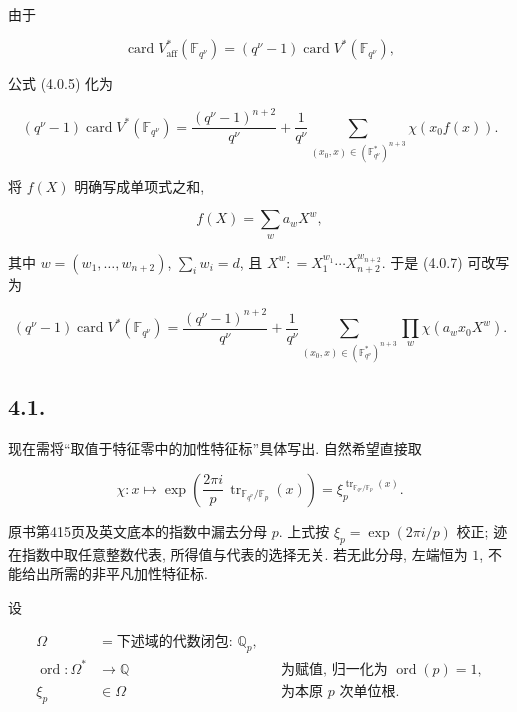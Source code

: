 由于

\begin{equation}\tag{4.0.6}
\operatorname{card}V^*_{\mathrm{aff}}(\mathbb F_{q^\nu})
=(q^\nu-1)\operatorname{card}V^*(\mathbb F_{q^\nu}),
\end{equation}

公式 (4.0.5) 化为

\begin{equation}\tag{4.0.7}
(q^\nu-1)\operatorname{card}V^*(\mathbb F_{q^\nu})
=\frac{(q^\nu-1)^{n+2}}{q^\nu}
+\frac1{q^\nu}
\sum_{(x_0,x)\in(\mathbb F_{q^\nu}^*)^{n+3}}\chi(x_0f(x)).
\end{equation}

将 $f(X)$ 明确写成单项式之和,

\begin{equation}\tag{4.0.8}
f(X)=\sum_w a_wX^w,
\end{equation}

其中 $w=(w_1,\ldots,w_{n+2})$, $\sum_iw_i=d$,
且 $X^w\mathrel{\mathop:}=X_1^{w_1}\cdots X_{n+2}^{w_{n+2}}$.
于是 (4.0.7) 可改写为

\begin{equation}\tag{4.0.9}
(q^\nu-1)\operatorname{card}V^*(\mathbb F_{q^\nu})
=\frac{(q^\nu-1)^{n+2}}{q^\nu}
+\frac1{q^\nu}
\sum_{(x_0,x)\in(\mathbb F_{q^\nu}^*)^{n+3}}
\prod_w\chi(a_wx_0X^w).
\end{equation}

\subsection*{4.1.}
现在需将“取值于特征零中的加性特征标”具体写出. 自然希望直接取

\begin{equation}\tag{4.1.0}
\chi:x\longmapsto
\exp\!\left(\frac{2\pi i}{p}\,\operatorname{tr}_{\mathbb F_{q^\nu}/\mathbb F_p}(x)\right)
=\xi_p^{\operatorname{tr}_{\mathbb F_{q^\nu}/\mathbb F_p}(x)}.
\end{equation}

\begin{editorialnote}
原书第415页及英文底本的指数中漏去分母 $p$. 上式按 $\xi_p=\exp(2\pi i/p)$ 校正;
迹在指数中取任意整数代表, 所得值与代表的选择无关. 若无此分母, 左端恒为 $1$, 不能给出所需的非平凡加性特征标.
\end{editorialnote}

设

\begin{align}
\tag{4.1.1}
\Omega&=\text{下述域的代数闭包: }\mathbb Q_p,\\
\tag{4.1.2}
\operatorname{ord}:\Omega^*&\longrightarrow\mathbb Q
  &&\text{为赋值, 归一化为 }\operatorname{ord}(p)=1,\\
\tag{4.1.3}
\xi_p&\in\Omega
  &&\text{为本原 $p$ 次单位根.}
\end{align}

